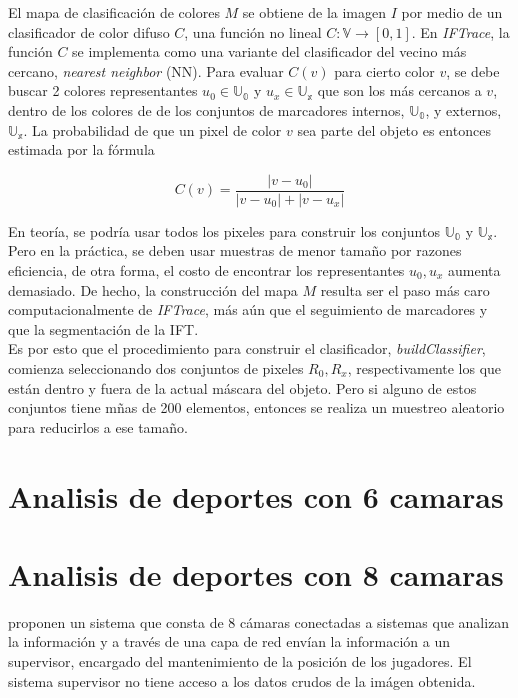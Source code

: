 \documentclass[a4paper,10pt]{article}
\begin{document}
El mapa de clasificación de colores $M$ se obtiene de la imagen $I$ por medio de un
clasificador de color difuso $C$, una función no lineal $C : \mathbb{V} \to [0,1]$.
En \textit{IFTrace}, la función $C$ se implementa como una variante del clasificador
del vecino más cercano, \textit{nearest neighbor} (NN). Para evaluar $C(v)$ para 
cierto color $v$, se debe buscar 2 colores representantes $u_{0} \in \mathbb{U_{0}}$ 
y $u_{x} \in \mathbb{U_{x}}$ que son los más cercanos a $v$, dentro de los colores de
de los conjuntos de marcadores internos, $\mathbb{U_{0}}$, y externos, $\mathbb{U_{x}}$.
La probabilidad de que un pixel de color $v$ sea parte del objeto es entonces estimada
por la fórmula

\begin{equation}
   \label{eq:IFTrace-color-classifier}
   C(v) = \frac{|v - u_{0}|}{|v - u_{0}| + |v - u_{x}|}
\end{equation}

En teoría, se podría usar todos los pixeles para construir los conjuntos 
$\mathbb{U_{0}}$ y $\mathbb{U_{x}}$. Pero en la práctica, se deben usar muestras 
de menor tamaño por razones eficiencia, de otra forma, el costo de encontrar los
representantes $u_{0},u_{x}$ aumenta demasiado. De hecho, la construcción del mapa
$M$ resulta ser el paso más caro computacionalmente de \textit{IFTrace}, más
aún que el seguimiento de marcadores y que la segmentación de la IFT.\\
Es por esto que el procedimiento para construir el clasificador, 
\textit{buildClassifier}, comienza seleccionando dos conjuntos de pixeles 
$R_{0},R_{x}$, respectivamente los que están dentro y fuera de la actual máscara
del objeto. Pero si alguno de estos conjuntos tiene mñas de 200 elementos,
entonces se realiza un muestreo aleatorio para reducirlos a ese tamaño.

\section{Analisis de deportes con 6 camaras}


\section{Analisis de deportes con 8 camaras}

\citeauthor*{xu-8cams} proponen un sistema que consta de 8 cámaras conectadas a sistemas que 
analizan la información y a través de una capa de red envían la información a un supervisor,
encargado del mantenimiento de la posición de los jugadores. El sistema supervisor no tiene 
acceso a los datos crudos de la imágen obtenida.
\end{document}

